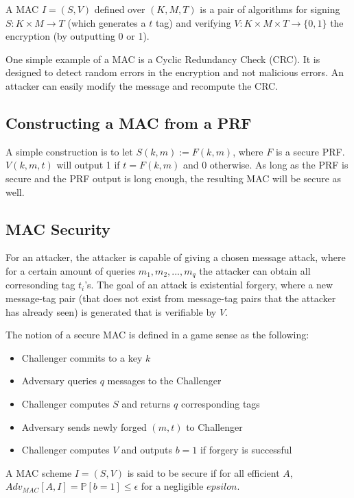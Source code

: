 \documentclass{article}
\begin{document}
\begin{multicols}{2}
A MAC $I = (S,V)$ defined over $(K,M,T)$ is a pair of algorithms for signing $S: K \times M \rightarrow T$ (which generates a $t$ tag) and verifying $V: K \times M \times T \rightarrow \{0,1\}$ the encryption (by outputting 0 or 1).

One simple example of a MAC is a Cyclic Redundancy Check (CRC). It is designed to detect random errors in the encryption and not malicious errors. An attacker can easily modify the message and recompute the CRC.

\subsection{Constructing a MAC from a PRF}

A simple construction is to let $S(k,m) := F(k,m)$, where $F$ is a secure PRF. $V(k,m,t)$ will output 1 if $t = F(k,m)$ and 0 otherwise. As long as the PRF is secure and the PRF output is long enough, the resulting MAC will be secure as well.

\subsection{MAC Security}

For an attacker, the attacker is capable of giving a chosen message attack, where for a certain amount of queries $m_1, m_2, ..., m_q$ the attacker can obtain all corresonding tag $t_i$'s. The goal of an attack is existential forgery, where a new message-tag pair (that does not exist from message-tag pairs that the attacker has already seen) is generated that is verifiable by $V$.

The notion of a secure MAC is defined in a game sense as the following:

\begin{itemize}
    \item Challenger commits to a key $k$
    \item Adversary queries $q$ messages to the Challenger
    \item Challenger computes $S$ and returns $q$ corresponding tags
    \item Adversary sends newly forged $(m,t)$ to Challenger
    \item Challenger computes $V$ and outputs $b=1$ if forgery is successful
\end{itemize}

A MAC scheme $I = (S,V)$ is said to be secure if for all efficient $A$, $Adv_{MAC}[A,I] = \mathbb{P}[b = 1] \leq \epsilon$ for a negligible $epsilon$.


\end{multicols}
\end{document}
